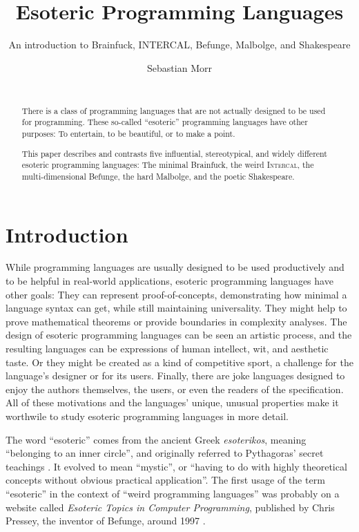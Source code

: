 \documentclass{sig-alternate}
\title{Esoteric Programming Languages}
\subtitle{An introduction to Brainfuck, INTERCAL, Befunge, Malbolge, and Shakespeare}
\author{\alignauthor Sebastian Morr\\\affaddr{Technical University Braunschweig}\\\email{sebastian@morr.cc}}
\newcommand{\ic}{\textsc{In\-ter\-cal}}
\begin{document}
\maketitle

\begin{abstract}
    There is a class of programming languages that are not actually designed to be used for programming. These so-called “esoteric” programming languages have other purposes: To entertain, to be beautiful, or to make a point.

    This paper describes and contrasts five influential, stereotypical, and widely different esoteric programming languages: The minimal Brainfuck, the weird \ic{}, the multi-dimensional Befunge, the hard Malbolge, and the poetic Shakespeare.
\end{abstract}

\section{Introduction}
\label{introduction}

While programming languages are usually designed to be used productively and to be helpful in real-world applications, esoteric programming languages have other goals: They can represent proof-of-concepts, demonstrating how minimal a language syntax can get, while still maintaining universality. They might help to prove mathematical theorems or provide boundaries in complexity analyses. The design of esoteric programming languages can be seen an artistic process, and the resulting languages can be expressions of human intellect, wit, and aesthetic taste. Or they might be created as a kind of competitive sport, a challenge for the language's designer or for its users. Finally, there are joke languages designed to enjoy the authors themselves, the users, or even the readers of the specification. All of these motivations and the languages' unique, unusual properties make it worthwile to study esoteric programming languages in more detail.

The word “esoteric” comes from the ancient Greek \emph{esoterikos}, meaning “belonging to an inner circle”, and originally referred to Pythagoras' secret teachings \cite{harper2014esoteric}. It evolved to mean “mystic”, or “having to do with highly theoretical concepts without obvious practical application”. The first usage of the term “esoteric” in the context of “weird programming languages” was probably on a website called \emph{Esoteric Topics in Computer Programming}, published by Chris Pressey, the inventor of Befunge, around 1997 \cite{pressey2005chris}.
\end{document}
